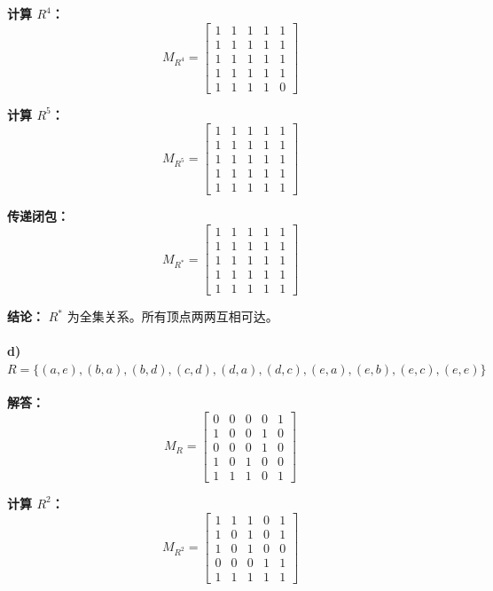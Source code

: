 \documentclass[11pt,UTF8]{article}
\begin{document}
\textbf{计算 $R^4$：}
\[
M_{R^4} = \begin{bmatrix}
1 & 1 & 1 & 1 & 1 \\
1 & 1 & 1 & 1 & 1 \\
1 & 1 & 1 & 1 & 1 \\
1 & 1 & 1 & 1 & 1 \\
1 & 1 & 1 & 1 & 0
\end{bmatrix}
\]

\textbf{计算 $R^5$：}
\[
M_{R^5} = \begin{bmatrix}
1 & 1 & 1 & 1 & 1 \\
1 & 1 & 1 & 1 & 1 \\
1 & 1 & 1 & 1 & 1 \\
1 & 1 & 1 & 1 & 1 \\
1 & 1 & 1 & 1 & 1
\end{bmatrix}
\]

\textbf{传递闭包：}
\[
M_{R^*} = \begin{bmatrix}
1 & 1 & 1 & 1 & 1 \\
1 & 1 & 1 & 1 & 1 \\
1 & 1 & 1 & 1 & 1 \\
1 & 1 & 1 & 1 & 1 \\
1 & 1 & 1 & 1 & 1
\end{bmatrix}
\]

\textbf{结论：} $R^*$ 为全集关系。所有顶点两两互相可达。

\paragraph{d) $R = \{(a,e),(b,a),(b,d),(c,d),(d,a),(d,c),(e,a),(e,b),(e,c),(e,e)\}$}

\textbf{解答：}
\[
M_R = \begin{bmatrix}
0 & 0 & 0 & 0 & 1 \\
1 & 0 & 0 & 1 & 0 \\
0 & 0 & 0 & 1 & 0 \\
1 & 0 & 1 & 0 & 0 \\
1 & 1 & 1 & 0 & 1
\end{bmatrix}
\]

\textbf{计算 $R^2$：}
\[
M_{R^2} = \begin{bmatrix}
1 & 1 & 1 & 0 & 1 \\
1 & 0 & 1 & 0 & 1 \\
1 & 0 & 1 & 0 & 0 \\
0 & 0 & 0 & 1 & 1 \\
1 & 1 & 1 & 1 & 1
\end{bmatrix}
\]
\end{document}
